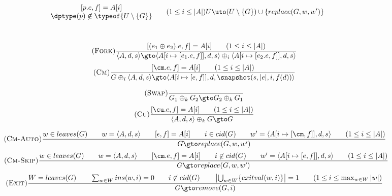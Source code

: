 \begin{figure}
\begin{minipage}{\textwidth}
\[{{\begin{matrix}
{\begin{matrix}
                [p.e,f] = A[i] \\
                \dptype(p)\not\in\typeof{U\setminus\{G\}}
              \end{matrix}}
              \qquad
              (1\le i\le |A|)
            \end{matrix}}}
    {U \uto (U\setminus\{G\}) \cup \{replace(G,w,w')\}}
  \]
%
  \flushright{}\\
  \begin{minipage}{0.59\textwidth}
  \[
    \tag{\sc Fork}\label{rule:fork}
    \frac{
    {[(e_1\oplus e_2).e,f]=A[i]}\qquad
    {(1\le i\le |A|)}}
    {\langle A,d,s\rangle \gto
      \langle A[i\mapsto[e_1.e,f]],d,s\rangle \oplus_i
      \langle A[i\mapsto[e_2.e,f]],d,s\rangle}
  \]
  \[
    \tag{\sc Cm}\label{rule:cm}
    \frac{
    {[\cm.e,f]=A[i]}\qquad
    {(1\le i\le |A|)}}
    {G\oplus_i\langle A,d,s\rangle \gto \langle A[i\mapsto[e,f]],d,\snapshot(s,|e|,i,f(d))\rangle}
  \]
  \end{minipage}
  \begin{minipage}{0.4\textwidth}
  \[
    \tag{\sc Swap}\label{rule:swap}
    \frac{}{G_1\oplus_k G_2 \gto G_2\oplus_k G_1}
  \]
  \[
    \tag{\sc Cu}\label{rule:cu}
    \frac{
    {[\cu.e,f]=A[i]}\qquad
    {(1\le i\le |A|)}}
    {\langle A,d,s\rangle\oplus_k G \gto G}
  \]
  \end{minipage}
  \vspace{1ex}
  \[
    \tag{\sc Cm-Auto}\label{rule:cm-auto}
    \frac{
      w\in leaves(G) \qquad
      w=\langle A,d,s\rangle \qquad
      [\epsilon,f]=A[i] \qquad
      i\in cid(G) \qquad
      w'=\langle A[i\mapsto[\cm,f]],d,s\rangle \qquad
      (1\le i\le |A|)
    }
    {G \gto replace(G,w,w')}
  \]
  \[
    \tag{\sc Cm-Skip}\label{rule:cm-skip}
    \frac{
      w\in leaves(G) \qquad
      w=\langle A,d,s\rangle \qquad
      [\cm.e,f]=A[i] \qquad
      i\not\in cid(G) \qquad
      w'=\langle A[i\mapsto[e,f]],d,s\rangle \qquad
      (1\le i\le |A|)
    }
    {G \gto replace(G,w,w')}
  \]
  \vspace{1ex}
  \[
    \tag{\sc Exit}\label{rule:exit}
    \frac{%
    W=leaves(G)
    \qquad \sum_{w\in W} ins(w,i)=0
    \qquad i\not\in cid(G)
    \qquad \left|\bigcup_{w\in W} \{exitval(w,i)\}\right|=1
    \qquad (1\le i\le\max_{w\in W} |w|)}
    {G \gto remove(G,i)}
  \]
  \vspace{1mm}
\end{minipage}

\end{figure}
